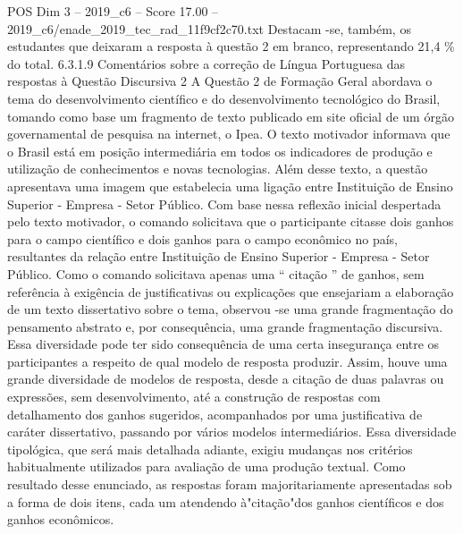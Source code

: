 \begin{textsample}{POS Dim 3 – 2019\_c6 – Score 17.00 – 2019\_c6/enade\_2019\_tec\_rad\_11f9cf2c70.txt}
Destacam -se, também, os estudantes que deixaram a resposta à questão 2 em branco, representando 21,4 \% do total. 6.3.1.9 Comentários sobre a correção de Língua Portuguesa das respostas à Questão Discursiva 2 A Questão 2 de Formação Geral abordava o tema do desenvolvimento científico e do desenvolvimento tecnológico do Brasil, tomando como base um fragmento de texto publicado em site oficial de um órgão governamental de pesquisa na internet, o Ipea.
O texto motivador informava que o Brasil está em posição intermediária em todos os indicadores de produção e utilização de conhecimentos e novas tecnologias.
Além desse texto, a questão apresentava uma imagem que estabelecia uma ligação entre Instituição de Ensino Superior - Empresa - Setor Público.
Com base nessa reflexão inicial despertada pelo texto motivador, o comando solicitava que o participante citasse dois ganhos para o campo científico e dois ganhos para o campo econômico no país, resultantes da relação entre Instituição de Ensino Superior - Empresa - Setor Público.
Como o comando solicitava apenas uma “ citação ” de ganhos, sem referência à exigência de justificativas ou explicações que ensejariam a elaboração de um texto dissertativo sobre o tema, observou -se uma grande fragmentação do pensamento abstrato e, por consequência, uma grande fragmentação discursiva.
Essa diversidade pode ter sido consequência de uma certa insegurança entre os participantes a respeito de qual modelo de resposta produzir.
Assim, houve uma grande diversidade de modelos de resposta, desde a citação de duas palavras ou expressões, sem desenvolvimento, até a construção de respostas com detalhamento dos ganhos sugeridos, acompanhados por uma justificativa de caráter dissertativo, passando por vários modelos intermediários.
Essa diversidade tipológica, que será mais detalhada adiante, exigiu mudanças nos critérios habitualmente utilizados para avaliação de uma produção textual.
Como resultado desse enunciado, as respostas foram majoritariamente apresentadas sob a forma de dois itens, cada um atendendo à"citação"dos ganhos científicos e dos ganhos econômicos.

\end{textsample}
